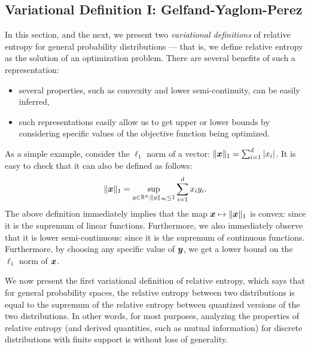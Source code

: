         \subsection{Variational Definition I: Gelfand-Yaglom-Perez} 
        \label{subsec:var-def-I-gelfand} 
            In this section, and the next, we present two \emph{variational definitions} of relative entropy for general probability distributions --- that is, we define relative entropy as the solution of an optimization problem. There are several benefits of such a representation: 
            \begin{itemize}
                \item several properties, such as convexity and lower semi-continuity, can be easily inferred, 
                \item such representations easily allow us to get upper or lower bounds by considering specific values of the objective function being optimized. 
            \end{itemize}

            \begin{example}
                \label{example:l1-norm}
                 As a simple example, consider the $\ell_1$ norm of a vector: $\|\boldsymbol{x}\|_1 = \sum_{i=1}^d |x_i|$. It is easy to check that it can also be defined as follows: 
                \begin{align}
                    \|\boldsymbol{x}\|_1 = \sup_{y \in \mathbb{R}^d: \|y\|_\infty \leq 1} \sum_{i=1}^d x_i y_i. 
                \end{align}
                The above definition immediately implies that the map $\boldsymbol{x} \mapsto \|\boldsymbol{x}\|_1$ is convex: since it is the supremum of linear functions. Furthermore, we also immediately observe that it is lower semi-continuous: since it is the supremum of continuous functions. Furthermore, by choosing any specific value of $\boldsymbol{y}$, we get a lower bound on the $\ell_1$ norm of $\boldsymbol{x}$.             
            \end{example}

            We now present the first variational definition of relative entropy, which says that for general probability spaces, the relative entropy between two distributions is equal to the supremum of the relative entropy between quantized versions of the two distributions. In other words, for most purposes, analyzing the properties of relative entropy (and derived quantities, such as mutual information) for discrete distributions with finite support is without loss of generality. 
        
